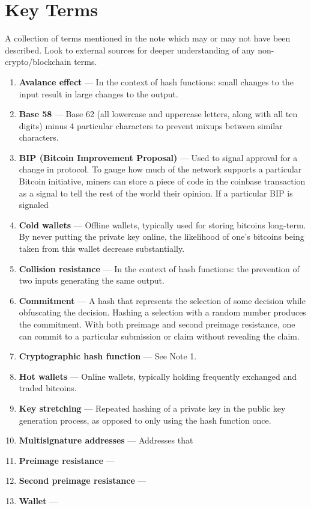 \documentclass[full.tex]{subfiles}
\begin{document}
    \section*{Key Terms}
    \noindent A collection of terms mentioned in the note which may or may not have been described. Look to external sources for deeper understanding of any non-crypto/blockchain terms.
    \begin{enumerate}
        \item \textbf{Avalance effect} --- In the context of hash functions: small changes to the input result in large changes to the output.
        \item \textbf{Base 58} --- Base 62 (all lowercase and uppercase letters, along with all ten digits) minus 4 particular characters to prevent mixups between similar characters.
        \item \textbf{BIP (Bitcoin Improvement Proposal)} --- Used to signal approval for a change in protocol. To gauge how much of the network supports a particular Bitcoin initiative, miners can store a piece of code in the coinbase transaction as a signal to tell the rest of the world their opinion. If a particular BIP is signaled 
        \item \textbf{Cold wallets} --- Offline wallets, typically used for storing bitcoins long-term. By never putting the private key online, the likelihood of one's bitcoins being taken from this wallet decrease substantially.
        \item \textbf{Collision resistance} --- In the context of hash functions: the prevention of two inputs generating the same output.
        \item \textbf{Commitment} --- A hash that represents the selection of some decision while obfuscating the decision. Hashing a selection with a random number produces the commitment. With both preimage and second preimage resistance, one can commit to a particular submission or claim without revealing the claim.
        \item \textbf{Cryptographic hash function} --- See Note 1.
        \item \textbf{Hot wallets} --- Online wallets, typically holding frequently exchanged and traded bitcoins. 
        \item \textbf{Key stretching} --- Repeated hashing of a private key in the public key generation process, as opposed to only using the hash function once.
        \item \textbf{Multisignature addresses} --- Addresses that 
        \item \textbf{Preimage resistance} --- 
        \item \textbf{Second preimage resistance} --- 
        \item \textbf{Wallet} --- 
    \end{enumerate}
\end{document}
